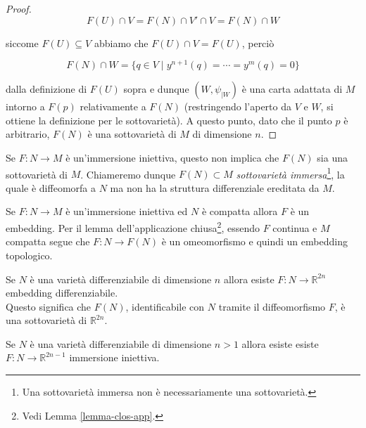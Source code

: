 \begin{proof}
	\begin{equation}
		F(U) \cap V = F(N) \cap V' \cap V = F(N) \cap W
	\end{equation}

	siccome $ F(U) \subseteq V $ abbiamo che $ F(U) \cap V = F(U) $, perciò
	
	\begin{equation}
		F(N) \cap W = \{ q \in V \mid y^{n+1}(q) = \cdots = y^{m}(q) = 0 \}
	\end{equation}

	dalla definizione di $ F(U) $ sopra e dunque $ (W,\psi_{|W}) $ è una carta adattata di $ M $ intorno a $ F(p) $ relativamente a $ F(N) $ (restringendo l'aperto da $ V $ e $ W $, si ottiene la definizione per le sottovarietà). A questo punto, dato che il punto $ p $ è arbitrario, $ F(N) $ è una sottovarietà di $ M $ di dimensione $ n $.
\end{proof}

\begin{remark}[1]
	Se $ F : N \to M $ è un'immersione iniettiva, questo non implica che $ F(N) $ sia una sottovarietà di $ M $. Chiameremo dunque $ F(N) \subset M $ \textit{sottovarietà immersa}\footnote{%
		Una sottovarietà immersa non è necessariamente una sottovarietà.%
	}, la quale è diffeomorfa a $ N $ ma non ha la struttura differenziale ereditata da $ M $.
\end{remark}

\begin{remark}[2]
	Se $ F : N \to M $ è un'immersione iniettiva ed $ N $ è compatta allora $ F $ è un embedding. Per il lemma dell'applicazione chiusa\footnote{%
		Vedi Lemma \ref{lemma-clos-app}.%
	}, essendo $ F $ continua e $ M $ compatta segue che $ F : N \to F(N) $ è un omeomorfismo e quindi un embedding topologico.
\end{remark}

\begin{theorem}[Whitney]
	Se $ N $ è una varietà differenziabile di dimensione $ n $ allora esiste $ F : N \to \mathbb{R}^{2n} $ embedding differenziabile.\\
	Questo significa che $ F(N) $, identificabile con $ N $ tramite il diffeomorfismo $ F $, è una sottovarietà di $ \mathbb{R}^{2n} $.
\end{theorem}

\begin{theorem}
	Se $ N $ è una varietà differenziabile di dimensione $ n>1 $ allora esiste esiste $ F : N \to \mathbb{R}^{2n-1} $ immersione iniettiva.
\end{theorem}


